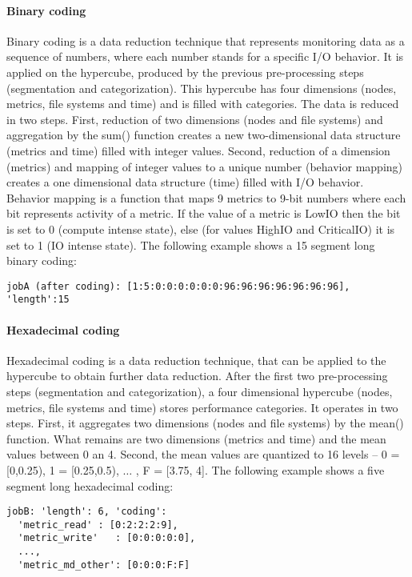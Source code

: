 \documentclass{jhps}
\begin{document}
\paragraph{Binary coding}
Binary coding is a data reduction technique that represents monitoring data as a sequence of numbers, where each number stands for a specific I/O behavior.
It is applied on the hypercube, produced by the previous pre-processing steps (segmentation and categorization).
This hypercube has four dimensions (nodes, metrics, file systems and time) and is filled with categories.
The data is reduced in two steps.
First, reduction of two dimensions (nodes and file systems) and aggregation by the sum() function creates a new two-dimensional data structure (metrics and time) filled with integer values.
Second, reduction of a dimension (metrics) and mapping of integer values to a unique number (behavior mapping) creates a one dimensional data structure (time) filled with I/O behavior.
Behavior mapping is a function that maps 9 metrics to 9-bit numbers where each bit represents activity of a metric.
If the value of a metric is LowIO then the bit is set to 0 (compute intense state), else (for values HighIO and CriticalIO) it is set to 1 (IO intense state).
The following example shows a 15 segment long binary coding:

\begin{lstlisting}
jobA (after coding): [1:5:0:0:0:0:0:0:96:96:96:96:96:96:96], 'length':15
\end{lstlisting}

\paragraph{Hexadecimal coding}
Hexadecimal coding is a data reduction technique, that can be applied to the hypercube to obtain further data reduction.
After the first two pre-processing steps (segmentation and categorization), a four dimensional hypercube (nodes, metrics, file systems and time) stores performance categories.
It operates in two steps.
First, it aggregates two dimensions (nodes and file systems) by the mean() function.
What remains are two dimensions (metrics and time) and the mean values between 0 an 4.
Second, the mean values are quantized to 16 levels -- 0 = [0,0.25), 1 = [0.25,0.5), $ \ldots $ , F = [3.75, 4].
The following example shows a five segment long hexadecimal coding:

\begin{lstlisting}
jobB: 'length': 6, 'coding':
  'metric_read'	: [0:2:2:2:9],
  'metric_write'   : [0:0:0:0:0],
  ...,
  'metric_md_other': [0:0:0:F:F]
\end{lstlisting}
\end{document}
